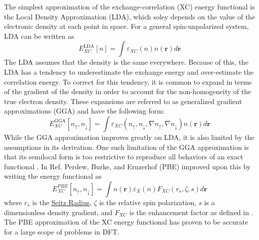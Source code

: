 \documentclass[12pt]{article}
\begin{document}
The simplest approximation of the exchange-correlation (XC) energy functional is the Local Density Approximation (LDA), which soley depends on the value of the electronic density at each point in space. For a general spin-unpolarized system, LDA can be written as 
\begin{equation*}
    E_{XC}^{\mathrm{LDA}}[n] = \int \varepsilon_{XC}(n)n(\textbf{r})d\textbf{r}
\end{equation*}
The LDA assumes that the density is the same everywhere. Because of this, the LDA has a tendency to underestimate the exchange energy and over-estimate the correlation energy. To correct for this tendency, it is common to expand in terms of the gradient of the density in order to account for the non-homogeneity of the true electron density. These expansions are referred to as generalized gradient approximations (GGA) and have the following form:
\begin{equation*}\label{eq:GGAfunc}
    E_{XC}^{\mathrm{GGA}}[n_{\uparrow},n_{\downarrow}] = \int \varepsilon_{XC}(n_{\uparrow},n_{\downarrow},\nabla n_{\uparrow},\nabla n_{\downarrow})n(\textbf{r})d\textbf{r}
\end{equation*}
While the GGA approximation improves greatly on LDA, it is also limited by the assumptions in its derivation. One such limitation of the GGA approximation is that its semilocal form is too restrictive to reproduce all behaviors of an exact functional \cite{PBE2}. In Ref. \cite{PBE} Perdew, Burke, and Ernzerhof (PBE) improved upon this by writing the energy functional as 
\begin{equation}\label{eq:PBEfunc}
    E^{PBE}_{XC}[n_{\uparrow},n_{\downarrow}] = \int n(\textbf{r})\varepsilon_X(n)F_{XC}(r_s,\zeta,s) d\textbf{r}
\end{equation}
where $r_s$ is the \href{https://en.wikipedia.org/wiki/Wigner\%E2\%80\%93Seitz_radius}{Seitz Radius}, $\zeta$ is the relative spin polarization, $s$ is a dimensionless density gradient, and $F_{XC}$ is the enhancement factor as defined in \cite{PBEfxc}. The PBE approximation of the XC energy functional has proven to be accurate for a large scope of problems in DFT.
\end{document}

